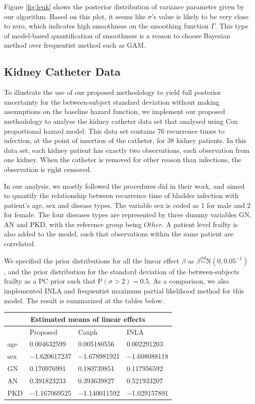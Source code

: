\documentclass[]{article}
\begin{document}
Figure \ref{fig:leuk} shows the posterior distribution of variance parameter given by our algorithm. Based on this plot, it seems like $\sigma$'s value is likely to be very close to zero, which indicates high smoothness on the smoothing function $\Gamma$. This type of model-based quantification of smoothness is a reason to choose Bayesian method over frequentist method such as GAM.


\subsection{Kidney Catheter Data}

To illustrate the use of our proposed methodology to yield full posterior uncertainty for the between-subject standard deviation without making assumptions on the baseline hazard function, we implement our proposed methodology to analyse the kidney catheter data set that \citet{kidney} analysed using Cox proportional hazard model. This data set contains 76 recurrence times to infection, at the point of insertion of the catheter, for 38 kidney patients. In this data set, each kidney patient has exactly two observations, each observation from one kidney. When the catheter is removed for other reason than infections, the observation is right censored.

In our analysis, we mostly followed the procedures \citet{kidney} did in their work, and aimed to quantify the relationship between recurrence time of bladder infection with patient's age, sex and  disease types. The variable sex is coded as 1 for male and 2 for female. The four diseases types are represented by three dummy variables $\text{GN}$, $\text{AN}$ and $\text{PKD}$, with the reference group being $Other$. A patient level frailty is also added to the model, such that observations within the same patient are correlated. 

We specified the prior distributions for all the linear effect $\beta$ as $\beta \stackrel{iid}{\sim} \text{N}(0, 0.05^{-1})$ , and the prior distribution for the standard deviation of the between-subjects frailty as a PC prior such that $\text{P}(\sigma > 2) = 0.5$. As a comparison, we also implemented INLA and frequentist maximum partial likelihood method for this model. The result is summarized at the tables below.


\begin{tabular}{ |p{3cm}||p{3cm}|p{3cm}|p{3cm}|  }
 \hline
 \multicolumn{4}{|c|}{Estimated means of linear effects} \\
 \hline
 & Proposed & Coxph & INLA \\
 \hline
 age & 0.004632599 & 0.005180556 & 0.002291203\\
 sex & −1.620617237  & −1.678981921 & −1.608088118\\
 GN & 0.170976991 & 0.180739851 & 0.117956592\\
 AN & 0.391823233 & 0.393639827 & 0.521933207\\
 PKD & −1.167069525  & −1.140011592 & −1.029157891\\
 \hline
\end{tabular}
\end{document}
